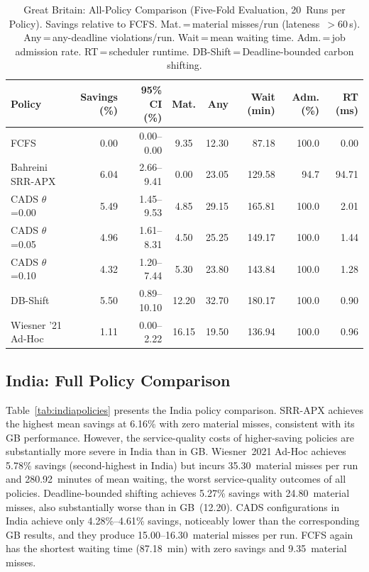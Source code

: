 \documentclass[conference]{IEEEtran}
\begin{document}
\begin{table}[t]
\caption{Great Britain: All-Policy Comparison (Five-Fold Evaluation, 20~Runs per Policy).\newline
\footnotesize Savings relative to FCFS. Mat.\,=\,material misses/run (lateness~$>60$\,s).
Any\,=\,any-deadline violations/run. Wait\,=\,mean waiting time. Adm.\,=\,job admission rate.
RT\,=\,scheduler runtime. DB-Shift\,=\,Deadline-bounded carbon shifting.}
\label{tab:gbpolicies}
\centering
\footnotesize
\begin{tabular}{@{}lrrcrrrr@{}}
\toprule
\textbf{Policy} & \textbf{Savings (\%)} & \textbf{95\% CI (\%)} & \textbf{Mat.} & \textbf{Any} & \textbf{Wait (min)} & \textbf{Adm. (\%)} & \textbf{RT (ms)} \\
\midrule
FCFS                  & 0.00 & 0.00--0.00 &  9.35 & 12.30 &  87.18 & 100.0 &  0.00 \\
Bahreini SRR-APX      & 6.04 & 2.66--9.41 &  0.00 & 23.05 & 129.58 &  94.7 & 94.71 \\
CADS $\theta$=0.00    & 5.49 & 1.45--9.53 &  4.85 & 29.15 & 165.81 & 100.0 &  2.01 \\
CADS $\theta$=0.05    & 4.96 & 1.61--8.31 &  4.50 & 25.25 & 149.17 & 100.0 &  1.44 \\
CADS $\theta$=0.10    & 4.32 & 1.20--7.44 &  5.30 & 23.80 & 143.84 & 100.0 &  1.28 \\
DB-Shift              & 5.50 & 0.89--10.10 & 12.20 & 32.70 & 180.17 & 100.0 &  0.90 \\
Wiesner '21 Ad-Hoc    & 1.11 & 0.00--2.22 & 16.15 & 19.50 & 136.94 & 100.0 &  0.96 \\
\bottomrule
\end{tabular}
\end{table}

\subsection{India: Full Policy Comparison}

Table~\ref{tab:indiapolicies} presents the India policy comparison. SRR-APX
achieves the highest mean savings at 6.16\% with zero material misses,
consistent with its GB performance. However, the service-quality costs of
higher-saving policies are substantially more severe in India than in GB.
Wiesner~2021 Ad-Hoc achieves 5.78\% savings (second-highest in India) but
incurs 35.30~material misses per run and 280.92~minutes of mean waiting,
the worst service-quality outcomes of all policies. Deadline-bounded shifting
achieves 5.27\% savings with 24.80~material misses, also substantially worse
than in GB~(12.20). CADS configurations in India achieve only 4.28\%--4.61\%
savings, noticeably lower than the corresponding GB results, and they produce
15.00--16.30~material misses per run. FCFS again has the shortest waiting time
(87.18~min) with zero savings and 9.35~material misses.
\end{document}
